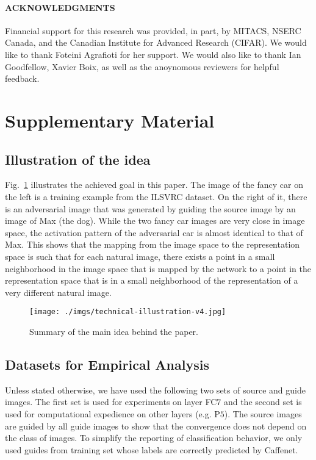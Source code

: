 \documentclass{article} %
\newcommand{\beginsupplement}{%
\renewcommand{\thesection}{}%
\renewcommand{\thesubsection}{S\arabic{subsection}}%
        \setcounter{table}{0}
        \renewcommand{\thetable}{S\arabic{table}}%
        \setcounter{figure}{0}
        \renewcommand{\thefigure}{S\arabic{figure}}%
     }
\begin{document}
\begin{footnotesize}
\paragraph{ACKNOWLEDGMENTS}  Financial support for this research was
provided, in part, by MITACS, NSERC Canada, and the Canadian Institute
for Advanced Research (CIFAR). We would like to thank Foteini Agrafioti
for her support. We would also like to thank Ian Goodfellow, Xavier Boix,
as well as the anoynomous reviewers for helpful feedback.
\end{footnotesize}


\vfill

\newpage
\beginsupplement\section*{Supplementary Material}\label{}\subsection{Illustration of the idea}
Fig.~\ref{fig:illustrate} illustrates the achieved goal in this paper. The
image of the fancy car on the left is a training example from the ILSVRC
dataset. On the right of it, there is an adversarial image that was generated
by guiding the source image by an image of Max (the dog). While the two fancy
car images are very close in image space, the activation pattern of the
adversarial car is almost identical to that of Max.  This shows that the
mapping from the image space to the representation space is such that for each
natural image, there exists a point in a small neighborhood in the image space
that is mapped by the network to a point in the representation space that is in
a small neighborhood of the representation of a very different natural image.

\begin{figure}[h]
\centering
\texttt{[image: ./imgs/technical-illustration-v4.jpg]}
\caption{Summary of the main idea behind the paper.} \label{fig:illustrate}
\vspace*{-0.2cm}
\end{figure}\subsection{Datasets for Empirical Analysis}

Unless stated otherwise,  we have used the following two sets of source and
guide images. The first set is used for experiments on layer FC$7$ and the
second set is used for computational expedience on other layers (e.g.  P$5$).
The source images are guided by all guide images to show that the convergence
does not depend on the class of images. To simplify the reporting of
classification behavior, we only used guides from training set whose labels are
correctly predicted by Caffenet.
\end{document}
